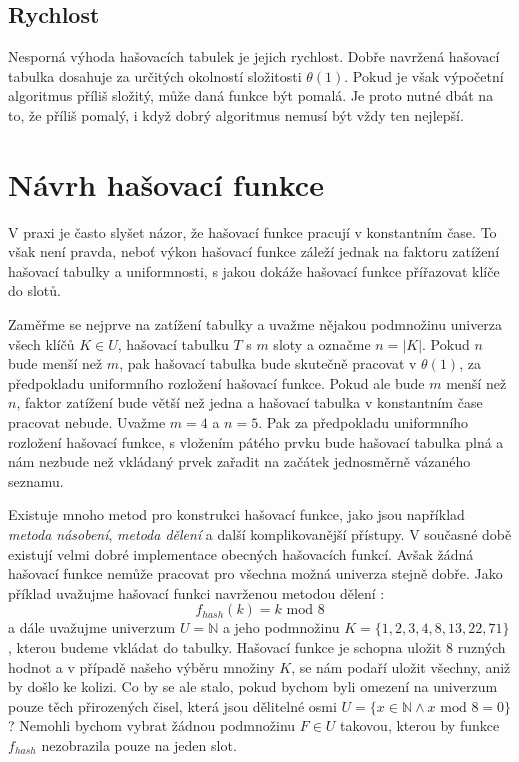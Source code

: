 \subsection{Rychlost}

Nesporná výhoda hašovacích tabulek je jejich rychlost. Dobře navržená hašovací
tabulka dosahuje za určitých okolností složitosti $\theta (1)$. Pokud je však
výpočetní algoritmus příliš složitý, může daná funkce být pomalá. Je proto
nutné dbát na to, že příliš pomalý, i když dobrý algoritmus nemusí být
vždy ten nejlepší. 

\section{Návrh hašovací funkce}
\label{se:hash_function_design}

V praxi je často slyšet názor, že hašovací funkce pracují v konstantním čase.
To však není pravda, neboť výkon hašovací funkce záleží jednak na faktoru
zatížení hašovací tabulky a uniformnosti, s jakou dokáže hašovací funkce
přířazovat klíče do slotů.

Zaměřme se nejprve na zatížení tabulky a uvažme nějakou podmnožinu univerza
všech klíčů $K \in U$, hašovací tabulku $T$ s $m$ sloty a označme $n = |K|$.
Pokud $n$ bude menší než $m$, pak hašovací tabulka bude skutečně pracovat v 
$\theta (1)$, za předpokladu uniformního rozložení hašovací funkce. Pokud ale
bude $m$ menší než $n$, faktor zatížení bude větší než jedna a hašovací tabulka
v konstantním čase pracovat nebude. Uvažme $m=4$ a $n=5$. Pak za předpokladu
uniformního rozložení hašovací funkce, s vložením pátého prvku bude hašovací 
tabulka plná a nám nezbude než vkládaný prvek zařadit na začátek jednosměrně
vázaného seznamu.

Existuje mnoho metod pro konstrukci hašovací funkce, jako jsou například
\textit{metoda násobení}, \textit{metoda dělení} a další komplikovanější
přístupy. V současné době existují velmi dobré implementace obecných hašovacích funkcí.
Avšak žádná hašovací funkce nemůže pracovat pro všechna možná univerza stejně
dobře. Jako příklad uvažujme hašovací funkci navrženou metodou dělení :
$$ f_{hash}(k) = k \text{ mod } 8 $$ 
a dále uvažujme univerzum $U = \mathbb{N}$ a jeho
podmnožinu $K = \{1,2,3,4,8,13,22,71\}$, kterou budeme vkládat do tabulky.
Hašovací funkce je schopna uložit $8$ ruzných hodnot a v případě 
našeho výběru množiny $K$, se nám podaří uložit všechny, aniž by došlo ke kolizi.
Co by se ale stalo, pokud bychom byli omezení na univerzum pouze těch
přirozených čisel, která jsou dělitelné osmi $U = \{x \in \mathbb{N}
\land x \text{ mod } 8 = 0\}$? Nemohli bychom vybrat žádnou podmnožinu 
$F \in U$ takovou, kterou by funkce $f_{hash}$ nezobrazila pouze na jeden
slot.

